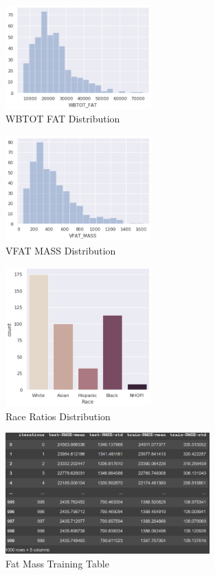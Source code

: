 \begin{figure}[!htb]
        \caption{WBTOT FAT Distribution}
        \centering
        \includegraphics[width=0.5\textwidth]{images/wbtot_fat.png}
\end{figure}


\begin{figure}[!htb]
        \caption{VFAT MASS Distribution}
        \centering
        \includegraphics[width=0.5\textwidth]{images/vfat_mass.png}
\end{figure}

\begin{figure}[!htb]
        \caption{Race Ratios Distribution}
        \centering
        \includegraphics[width=0.5\textwidth]{images/race_ratios.png}
\end{figure}
\begin{figure}[!htb]
        \caption{Fat Mass Training Table}
        \centering
        \includegraphics[width=0.7\textwidth]{images/catboost_training.png}
\end{figure}

